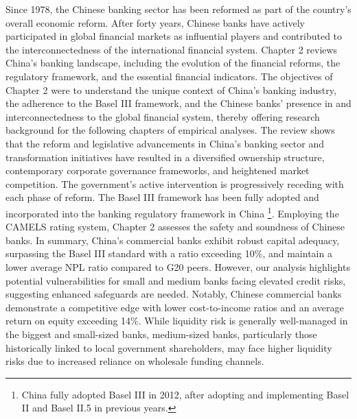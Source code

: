 \documentclass[
  12pt,
  a4paper,
]{scrreprt}
\begin{document}
Since 1978, the Chinese banking sector has been reformed as part of the
country's overall economic reform. After forty years, Chinese banks have
actively participated in global financial markets as influential players
and contributed to the interconnectedness of the international financial
system. Chapter 2 reviews China's banking landscape, including the
evolution of the financial reforms, the regulatory framework, and the
essential financial indicators. The objectives of Chapter 2 were to
understand the unique context of China's banking industry, the adherence
to the Basel III framework, and the Chinese banks' presence in and
interconnectedness to the global financial system, thereby offering
research background for the following chapters of empirical analyses.
The review shows that the reform and legislative advancements in China's
banking sector and transformation initiatives have resulted in a
diversified ownership structure, contemporary corporate governance
frameworks, and heightened market competition. The government's active
intervention is progressively receding with each phase of reform. The
Basel III framework has been fully adopted and incorporated into the
banking regulatory framework in China \footnote{China fully adopted
  Basel III in 2012, after adopting and implementing Basel II and Basel
  II.5 in previous years.}. Employing the CAMELS rating system, Chapter
2 assesses the safety and soundness of Chinese banks. In summary,
China's commercial banks exhibit robust capital adequacy, surpassing the
Basel III standard with a ratio exceeding 10\%, and maintain a lower
average NPL ratio compared to G20 peers. However, our analysis
highlights potential vulnerabilities for small and medium banks facing
elevated credit risks, suggesting enhanced safeguards are needed.
Notably, Chinese commercial banks demonstrate a competitive edge with
lower cost-to-income ratios and an average return on equity exceeding
14\%. While liquidity risk is generally well-managed in the biggest and
small-sized banks, medium-sized banks, particularly those historically
linked to local government shareholders, may face higher liquidity risks
due to increased reliance on wholesale funding channels.
\end{document}
